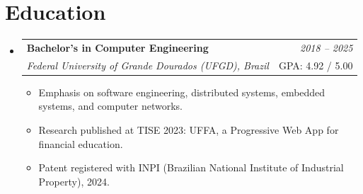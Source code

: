 \documentclass[a4paper,11pt]{article}
\makeatletter
\newcommand{\resumeSubheading}[4]{
\vspace{0.5mm}\item
    \begin{tabular*}{0.98\textwidth}[t]{l@{\extracolsep{\fill}}r}
        \textbf{#1} & \textit{\footnotesize{#4}} \\
        \textit{\footnotesize{#3}} &  \footnotesize{#2}\\
    \end{tabular*}
    \vspace{-2.4mm}
}
\newcommand{\resumeSubHeadingListStart}{\begin{itemize}[leftmargin=*,labelsep=0mm]}
\newcommand{\resumeItemListStart}{\begin{justify}\begin{itemize}[leftmargin=3ex, rightmargin=2ex, noitemsep,labelsep=1.2mm,itemsep=0mm]\small}
\newcommand{\resumeSubHeadingListEnd}{\end{itemize}\vspace{2mm}}
\newcommand{\resumeItemListEnd}{\end{itemize}\end{justify}\vspace{-2mm}}
\makeatother
\begin{document}
\section{\textbf{Education}}
  \resumeSubHeadingListStart
    \resumeSubheading
      {Bachelor's in Computer Engineering}{GPA: 4.92 / 5.00}
      {Federal University of Grande Dourados (UFGD), Brazil}{2018 -- 2025}
      \resumeItemListStart
        \item{Emphasis on software engineering, distributed systems, embedded systems, and computer networks.}
        \item{Research published at TISE 2023: UFFA, a Progressive Web App for financial education.}
        \item{Patent registered with INPI (Brazilian National Institute of Industrial Property), 2024.}
      \resumeItemListEnd
  \resumeSubHeadingListEnd
\vspace{-5.5mm}
\end{document}
